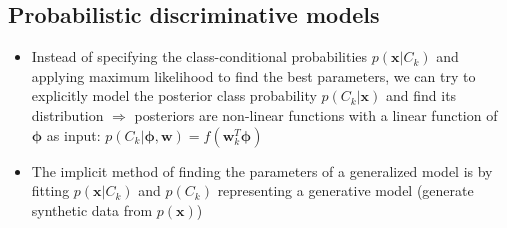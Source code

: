 \subsection{Probabilistic discriminative models}
\begin{itemize}
	\item Instead of specifying the class-conditional probabilities $p\left(\bm{x}|C_k\right)$ and applying maximum likelihood to find the best parameters, we can try to explicitly model the posterior class probability $p\left(C_k|\bm{x}\right)$ and find its distribution $\Rightarrow$ posteriors are non-linear functions with a linear function of $\bm{\phi}$ as input: $p\left(C_k|\bm{\phi}, \bm{w}\right) = f(\bm{w}_k^T\bm{\phi})$
	\item The implicit method of finding the parameters of a generalized model is by fitting $p\left(\bm{x}|C_k\right)$ and $p\left(C_k\right)$ representing a generative model (generate synthetic data from $p(\bm{x})$)
\end{itemize}
